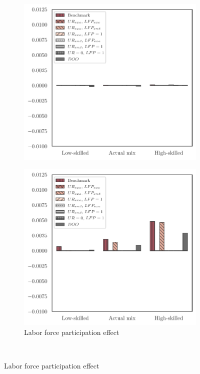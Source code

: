 \documentclass[a4paper,12pt]{article}
\begin{document}
\begin{landscape}
\begin{center}
\begin{figure}[htb!]
\begin{subfigure}{.3\linewidth}
  \includegraphics[width=\linewidth]{graphs/qURn.pdf}
\end{subfigure}
\hfill
\begin{subfigure}{.3\linewidth}
  \centering
\caption{Labor force participation effect} \label{fig:decomp_mean_ln}
  \includegraphics[width=\linewidth]{graphs/qln.pdf}
\end{subfigure}
\\[0.5cm]

\end{figure}
\end{center}
\end{landscape}
\end{document}
